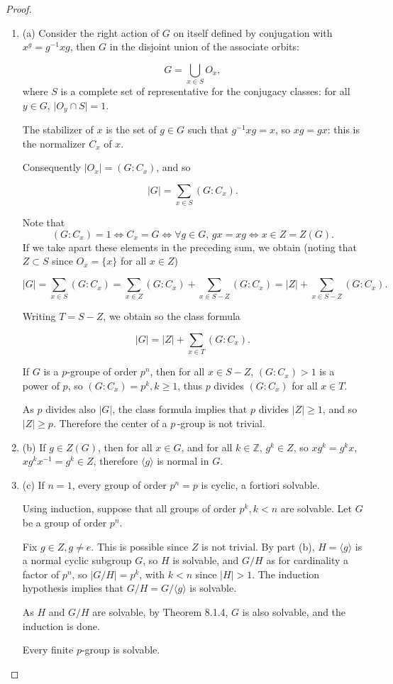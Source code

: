 \documentclass[11pt,a4paper]{article}
\newcommand{\be} {\begin{enumerate}}
\newcommand{\ee} {\end{enumerate}}
\begin{document}
\begin{proof}
\be
\item[(a)]
Consider the right action of $G$ on itself defined by conjugation with $x^g = g^{-1} x g$, then $G$ in the disjoint union of the associate orbits:

$$G = \bigcup_{x \in S} O_x,$$
where $S$ is a complete set of representative for the conjugacy classes: for all $y \in G$, $\vert O_y \cap S \vert = 1$.

The stabilizer of $x$ is the set of  $g \in G$ such that $g^{-1} x g = x$, so $xg = gx$: this is the normalizer $C_x$ of $x$.

Consequently  $\vert O_x \vert = (G : C_x)$, and so

$$\vert G \vert = \sum_{x \in S} (G:C_x).$$

Note that $$(G:C_x) = 1\iff C_x = G\iff \forall g \in G,\, gx = xg \iff x \in Z = Z(G).$$ If we take apart these elements in the preceding sum, we obtain (noting that  $Z \subset S$ since $O_x = \{x\}$ for all $x \in Z$) 

$$ \vert G \vert = \sum_{x \in S} (G:C_x) = \sum_{x \in Z} (G:C_x) + \sum_{x \in S - Z} (G:C_x) = \vert Z \vert + \sum_{x \in S-Z} (G:C_x).$$

Writing $T = S - Z$, we obtain so the class formula

$$ \vert G \vert = \vert Z \vert + \sum_{x \in T} (G:C_x).$$


If $G$ is a $p$-groupe of order $p^n$, then for all $x \in S - Z$, $(G:C_x) >1$ is a power of $p$, so $(G:C_x) = p^k, k\geq 1$, thus $p$ divides $(G:C_x)$ for all $x \in T$.

As $p$ divides also $\vert G \vert$, the class formula implies that $p$ divides $\vert Z \vert \geq 1$, and so $\vert Z \vert \geq p$. Therefore the center of a  $p\,$-group is not trivial.


\item[(b)] If $g \in Z(G)$, then for all $x \in G$, and for all $k \in \mathbb{Z}$, $ g^k \in Z$, so $x g^k = g^k x$, $x g^k x^{-1} = g^k \in Z$, therefore $\langle g \rangle$ is normal in $G$.


\item[(c)] If $n=1$, every group of order $p^n = p$ is cyclic, a fortiori solvable.

Using induction, suppose that all groups of order $p^k, k<n$ are solvable. Let $G$ be a group of order $p^n$.

Fix $g \in Z, g \neq e$. This is possible since $Z$ is not trivial. By part (b),  $H = \langle g \rangle$ is a normal cyclic subgroup $G$, so $H$ is solvable, and $G/H$ as for cardinality a factor of $p^n$, so $|G/H| = p^k$, with $k<n$ since $\vert H \vert > 1$. The induction hypothesis implies that $G/H = G/\langle g \rangle$ is solvable.

As $H$ and $G/H$ are solvable, by Theorem 8.1.4, $G$ is also solvable, and the induction is done.

Every finite $p$-group is solvable.
\ee
\end{proof}
\end{document}
